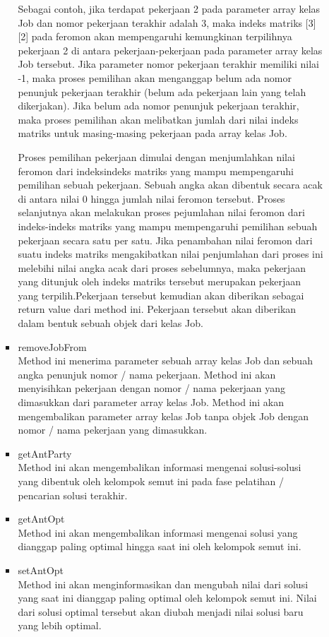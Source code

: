 \begin{itemize}
\begin{itemize}
\begin{itemize}
				Sebagai contoh, jika terdapat pekerjaan 2 pada parameter array kelas Job dan nomor
				pekerjaan terakhir adalah 3, maka indeks matriks [3][2] pada feromon akan mempengaruhi
				kemungkinan terpilihnya pekerjaan 2 di antara pekerjaan-pekerjaan pada
				parameter array kelas Job tersebut. Jika parameter nomor pekerjaan terakhir memiliki
				nilai -1, maka proses pemilihan akan menganggap belum ada nomor penunjuk
				pekerjaan terakhir (belum ada pekerjaan lain yang telah dikerjakan). Jika belum
				ada nomor penunjuk pekerjaan terakhir, maka proses pemilihan akan melibatkan
				jumlah dari nilai indeks matriks untuk masing-masing pekerjaan pada array kelas
				Job.
				
				Proses pemilihan pekerjaan dimulai dengan menjumlahkan nilai feromon dari indeksindeks
				matriks yang mampu mempengaruhi pemilihan sebuah pekerjaan. Sebuah
				angka akan dibentuk secara acak di antara nilai 0 hingga jumlah nilai feromon tersebut.
				Proses selanjutnya akan melakukan proses pejumlahan nilai feromon dari
				indeks-indeks matriks yang mampu mempengaruhi pemilihan sebuah pekerjaan secara
				satu per satu. Jika penambahan nilai feromon dari suatu indeks matriks mengakibatkan
				nilai penjumlahan dari proses ini melebihi nilai angka acak dari proses
				sebelumnya, maka pekerjaan yang ditunjuk oleh indeks matriks tersebut merupakan
				pekerjaan yang terpilih.Pekerjaan tersebut kemudian akan diberikan sebagai return value 
				dari method ini. Pekerjaan tersebut akan diberikan dalam bentuk sebuah objek dari kelas Job.
						
				\item removeJobFrom \\
				Method ini menerima parameter sebuah array kelas Job dan sebuah angka penunjuk
				nomor / nama pekerjaan. Method ini akan menyisihkan pekerjaan dengan nomor /
				nama pekerjaan yang dimasukkan dari parameter array kelas Job. Method ini akan
				mengembalikan parameter array kelas Job tanpa objek Job dengan nomor / nama
				pekerjaan yang dimasukkan.
				\item getAntParty \\
				Method ini akan mengembalikan informasi mengenai solusi-solusi yang dibentuk oleh
				kelompok semut ini pada fase pelatihan / pencarian solusi terakhir.
				\item getAntOpt \\
				Method ini akan mengembalikan informasi mengenai solusi yang dianggap paling
				optimal hingga saat ini oleh kelompok semut ini.
				\item setAntOpt \\
				Method ini akan menginformasikan dan mengubah nilai dari solusi yang saat ini
				dianggap paling optimal oleh kelompok semut ini. Nilai dari solusi optimal tersebut
				akan diubah menjadi nilai solusi baru yang lebih optimal.
			\end{itemize}
		\end{itemize}
	\end{itemize}
		